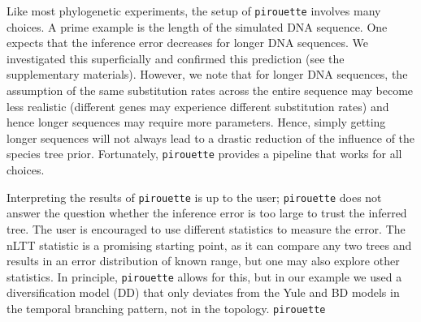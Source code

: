 Like most phylogenetic experiments, the setup of \verb;pirouette;
involves many choices. A prime example is the
length of the simulated DNA sequence. One expects that the inference error
decreases for longer DNA sequences. We investigated this
superficially and confirmed this prediction (see the supplementary materials). 
However, we note that for longer DNA sequences, the assumption 
of the same substitution rates across the entire sequence may become less realistic (different genes may experience different substitution rates)
and hence longer sequences may require more parameters. 
Hence, simply getting longer sequences will not always lead to a drastic 
reduction of the influence of the species tree prior.
Fortunately, \verb;pirouette; provides a pipeline that works for all choices.

Interpreting the results of \verb;pirouette; is up to the user; 
\verb;pirouette; does not answer the question 
whether the inference error is too large to trust the inferred tree. The user is encouraged to use different statistics to measure the error. The nLTT statistic is
a promising starting point, as it can compare any two trees and 
results in an error distribution of known range, but one may also explore other statistics.
In principle, \verb;pirouette; allows for this, but in our example we used a diversification model (DD) that only deviates from the Yule and BD models in the temporal branching pattern, not in the topology.
    \verb;pirouette;
